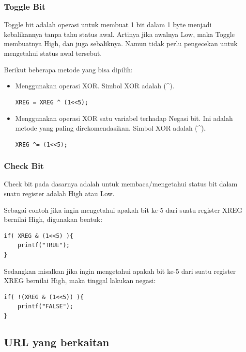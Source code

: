 \documentclass[12pt,]{article}
\begin{document}
	\subsubsection{Toggle Bit}
	
	Toggle bit adalah operasi untuk membuat 1 bit dalam 1 byte menjadi kebalikannya tanpa tahu status awal.
	Artinya jika awalnya Low, maka Toggle membuatnya High, dan juga sebaliknya.
	Namun tidak perlu pengecekan untuk mengetahui status awal tersebut.
	
	Berikut beberapa metode yang bisa dipilih:
	\begin{itemize}
		
		\item Menggunakan operasi XOR.
		Simbol XOR adalah (\^{}).
		\begin{verbatim}
XREG = XREG ^ (1<<5);
		\end{verbatim}
		
		\item Menggunakan operasi XOR satu variabel terhadap Negasi bit.
		Ini adalah metode yang paling direkomendasikan.
		Simbol XOR adalah (\^{}).
		\begin{verbatim}
XREG ^= (1<<5);
		\end{verbatim}
	\end{itemize}

	\subsubsection{Check Bit}
	
	Check bit pada dasarnya adalah untuk membaca/mengetahui status bit dalam suatu register adalah High atau Low.
	
	Sebagai contoh jika ingin mengetahui apakah bit ke-5 dari suatu register XREG bernilai High, digunakan bentuk:
	
	\begin{verbatim}
if( XREG & (1<<5) ){
	printf("TRUE");
}
	\end{verbatim}
	
	Sedangkan misalkan jika ingin mengetahui apakah bit ke-5 dari suatu register XREG bernilai High, maka tinggal lakukan negasi:
	\begin{verbatim}
if( !(XREG & (1<<5)) ){
	printf("FALSE");
}
	\end{verbatim}
	
	\subsection{URL yang berkaitan}
	
\end{document}
